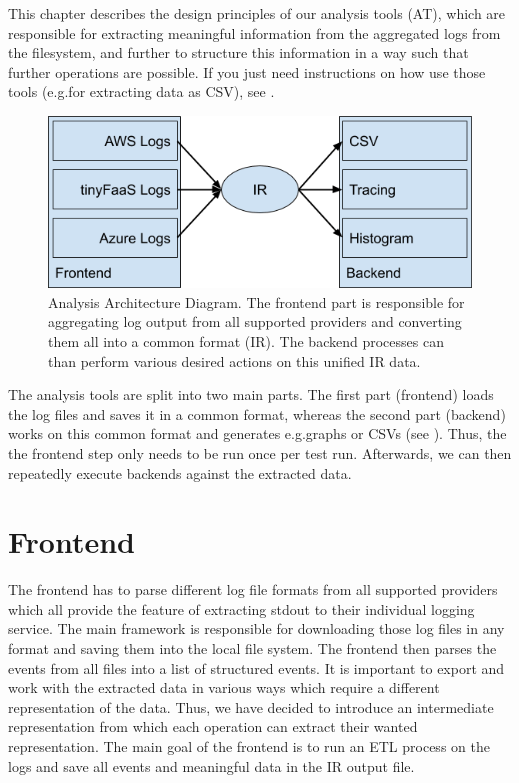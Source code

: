 \documentclass[../main.tex]{subfiles}
\begin{document}
This chapter %
describes the design principles of our analysis tools (AT), 
which are responsible for extracting meaningful information from the aggregated logs from the filesystem, 
and further to structure this information in a way such that further operations are possible. 
If you just need instructions on how use those tools (e.g.\@ for extracting data as CSV), 
see .

\begin{figure}
\begin{center}
  \includegraphics[width=\linewidth,keepaspectratio]{./IR-diagram.png}
\end{center}
\caption[Analysis Architecture Diagram]{%
Analysis Architecture Diagram. 
The frontend part is responsible for aggregating log output from all supported providers
and converting them all into a common format (IR). 
The backend processes can than perform various desired actions on this unified IR data.}%
\label{fig:analysisArchitectureDiagram}
\end{figure}

The analysis tools are split into two main parts. 
The first part (frontend) loads the log files and saves it in a common format, 
whereas the second part (backend) works on this common format and generates e.g.\@ graphs or CSVs
(see ).
Thus, the the frontend step only needs to be run once per test run.
Afterwards, we can then repeatedly execute backends against the extracted data.

\section{Frontend}%
\label{sec:analysisFrontend}

The frontend has to parse different log file formats from all supported providers 
which all provide the feature of extracting stdout to their individual logging service. 
The main framework is responsible for downloading those log files in any format and saving them into the local file system. 
The frontend then parses the events from all files into a list of structured events. 
It is important to export and work with the extracted data in various ways which require a different representation of the data. 
Thus, we have decided to introduce an intermediate representation from which each operation can extract their wanted representation. 
The main goal of the frontend is to run an ETL process on the logs and save all events and meaningful data in the IR output file.
\end{document}
